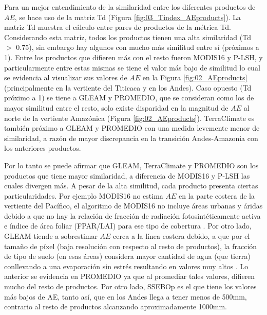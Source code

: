 \documentclass[12pt]{article}
\begin{document}
\thispagestyle{empty}

Para un mejor entendimiento de la similaridad entre los diferentes productos de $AE$, se hace uso de la matriz Td (Figura \ref{fig:03_Tindex_AEproducts}). La matriz Td muestra el cálculo entre pares de productos de la métrica Td. Considerando esta matriz, todos los productos tienen una alta similaridad (Td $>$ 0.75), sin embargo hay algunos con mucho más similitud entre sí (próximos a 1). Entre los productos que difieren más con el resto fueron MODIS16 y P-LSH, y particularmente entre estas mismas se tiene el valor más bajo de similitud lo cual se evidencia al visualizar sus valores de $AE$ en la Figura \ref{fig:02_AEproducts} (principalmente en la vertiente del Titicaca y en los Andes). Caso opuesto (Td próximo a 1) se tiene a GLEAM y PROMEDIO, que se consideran como los de mayor similitud entre el resto, solo existe disparidad en la magnitud de $AE$ al norte de la vertiente Amazónica (Figura \ref{fig:02_AEproducts}). TerraClimate es también próximo a GLEAM y PROMEDIO con una medida levemente menor de similaridad, a razón de mayor discrepancia en la transición Andes-Amazonia con los anteriores productos.

Por lo tanto se puede afirmar que GLEAM, TerraClimate y PROMEDIO son los productos que tiene mayor similaridad, a diferencia de MODIS16 y P-LSH las cuales divergen más. A pesar de la alta similitud, cada producto presenta ciertas particularidades. Por ejemplo MODIS16 no estima $AE$ en la parte costera de la vertiente del Pacífico, el algoritmo de MODIS16 no incluye áreas urbanas y áridas debido a que no hay la relación de fracción de radiación fotosintéticamente activa e índice de área foliar (FPAR/LAI) para ese tipo de cobertura \citep{mu2013modis}. Por otro lado, GLEAM tiende a sobrestimar $AE$ cerca a la línea costera debido, a que por el tamaño de píxel (baja resolución con respecto al resto de productos), la fracción de tipo de suelo (en esas áreas) considera mayor cantidad de agua (que tierra) conllevando a una evaporación sin estrés resultando en valores muy altos \citep{Martens2017}. Lo anterior se evidencia en PROMEDIO ya que al promediar tales valores, difieren mucho del resto de productos. Por otro lado, SSEBOp es el que tiene los valores más bajos de AE, tanto así, que en los Andes llega a tener menos de 500mm, contrario al resto de productos alcanzando aproximadamente 1000mm.

\vspace*{.5cm}

\end{document}
